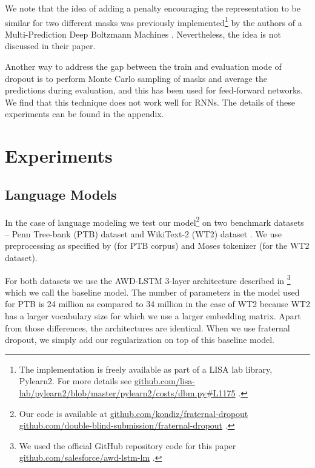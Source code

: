 \documentclass{article} \usepackage{iclr2018_conference,times}
\begin{document}
We note that the idea of adding a penalty encouraging the representation to be similar for two different masks was previously implemented\footnote{The implementation is freely available as part of a LISA lab library, Pylearn2. For more details see \url{github.com/lisa-lab/pylearn2/blob/master/pylearn2/costs/dbm.py\#L1175} .} by the authors of a Multi-Prediction Deep Boltzmann Machines \citep{goodfellow2013multi}. Nevertheless, the idea is not discussed in their paper.

Another way to address the gap between the train and evaluation mode of dropout is to perform Monte Carlo sampling of masks and average the predictions during evaluation, and this has been used for feed-forward networks. We find that this technique does not work well for RNNs. The details of these experiments can be found in the appendix. 

\section{Experiments}

\subsection{Language Models} \label{subsec:elm}
In the case of language modeling we test our model\footnote{Our code is available at 
\ificlrfinal
\url{github.com/kondiz/fraternal-dropout}
\else
\url{github.com/double-blind-submission/fraternal-dropout}
\fi
.} on two benchmark datasets -- Penn Tree-bank (PTB) dataset \citep{marcus1993building} and WikiText-2 (WT2) dataset \citep{DBLP:journals/corr/MerityXBS16}. We use preprocessing as specified by \citet{mikolov2010recurrent} (for PTB corpus) and Moses tokenizer \citet{koehn2007moses} (for the WT2 dataset).

For both datasets we use the AWD-LSTM 3-layer architecture described in \citet{merity2017regularizing}\footnote{We used the official GitHub repository code for this paper \url{github.com/salesforce/awd-lstm-lm} .} which we call the baseline model. The number of parameters in the model used for PTB is 24 million as compared to 34 million in the case of WT2 because WT2 has a larger vocabulary size for which we use a larger embedding matrix. Apart from those differences, the architectures are identical. When we use fraternal dropout, we simply add our regularization on top of this baseline model.
\end{document}
